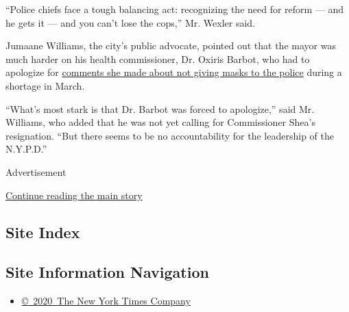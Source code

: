 ``Police chiefs face a tough balancing act: recognizing the need for
reform --- and he gets it --- and you can't lose the cops,'' Mr. Wexler
said.

Jumaane Williams, the city's public advocate, pointed out that the mayor
was much harder on his health commissioner, Dr. Oxiris Barbot, who had
to apologize for
\href{https://www.nytimes.com/2020/05/19/nyregion/barbot-police-health-coronavirus.html}{comments
she made about not giving masks to the police} during a shortage in
March.

``What's most stark is that Dr. Barbot was forced to apologize,'' said
Mr. Williams, who added that he was not yet calling for Commissioner
Shea's resignation. ``But there seems to be no accountability for the
leadership of the N.Y.P.D.''

Advertisement

\protect\hyperlink{after-bottom}{Continue reading the main story}

\hypertarget{site-index}{%
\subsection{Site Index}\label{site-index}}

\hypertarget{site-information-navigation}{%
\subsection{Site Information
Navigation}\label{site-information-navigation}}

\begin{itemize}
\tightlist
\item
  \href{https://help.nytimes.com/hc/en-us/articles/115014792127-Copyright-notice}{©~2020~The
  New York Times Company}
\end{itemize}

